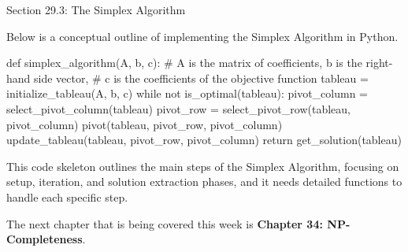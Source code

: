 \begin{notes}{Section 29.3: The Simplex Algorithm}
    \begin{highlight}
    
    Below is a conceptual outline of implementing the Simplex Algorithm in Python.
    
    \begin{code}[Python]
    def simplex_algorithm(A, b, c):
        # A is the matrix of coefficients, b is the right-hand side vector,
        # c is the coefficients of the objective function
        tableau = initialize_tableau(A, b, c)
        while not is_optimal(tableau):
            pivot_column = select_pivot_column(tableau)
            pivot_row = select_pivot_row(tableau, pivot_column)
            pivot(tableau, pivot_row, pivot_column)
            update_tableau(tableau, pivot_row, pivot_column)
        return get_solution(tableau)
    \end{code}
    This code skeleton outlines the main steps of the Simplex Algorithm, focusing on setup, iteration, and solution extraction phases, and it needs detailed functions to handle each specific step.
    \end{highlight}    
\end{notes}

The next chapter that is being covered this week is \textbf{Chapter 34: NP-Completeness}.

